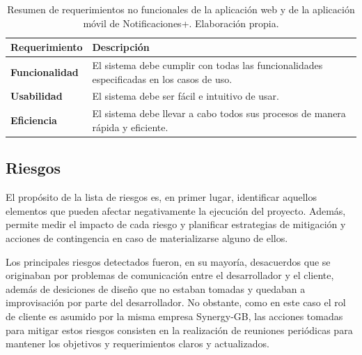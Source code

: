\begin{table}[H]
\centering 
\begin{tabular}{| p{3cm} | p{13cm} |}
\hline 
\bfseries \footnotesize {Requerimiento} & \bfseries \footnotesize {Descripción} \\ 
\hline 
\bfseries \footnotesize {Funcionalidad} & \footnotesize El sistema debe cumplir con todas las funcionalidades especificadas en los casos de uso. \\ \hline 
\bfseries \footnotesize {Usabilidad} & \footnotesize El sistema debe ser fácil e intuitivo de usar.  \\ \hline 
\bfseries \footnotesize {Eficiencia} & \footnotesize El sistema debe llevar a cabo todos sus procesos de manera rápida y eficiente.  \\ \hline 
\end{tabular}
\footnotesize \caption{Resumen de requerimientos no funcionales de la aplicación web y de la aplicación móvil de Notificaciones+. Elaboración propia.}
\label{table:ReqNoFunc}
\end{table}




\subsection{Riesgos}
El propósito de la lista de riesgos es, en primer lugar, identificar aquellos elementos que pueden afectar negativamente la ejecución del proyecto. Además, permite medir el impacto de cada riesgo y planificar estrategias de mitigación y acciones de contingencia en caso de materializarse alguno de ellos.


Los principales riesgos detectados fueron, en su mayoría, desacuerdos que se originaban por problemas de comunicación entre el desarrollador y el cliente, además de desiciones de diseño que no estaban tomadas y quedaban a improvisación por parte del desarrollador. No obstante, como en este caso el rol de cliente es asumido por la misma empresa Synergy-GB,  las acciones tomadas para mitigar estos riesgos consisten en la realización de reuniones periódicas para mantener los objetivos y requerimientos claros y actualizados.


